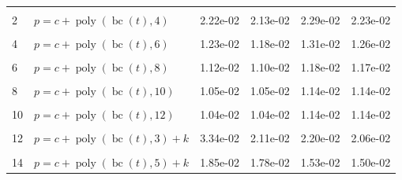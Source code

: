 \documentclass[12pt,a4paper]{article}
\DeclareMathOperator{\bc}{bc}
\DeclareMathOperator{\poly}{poly}
\begin{document}
\begin{longtable}[t]{ll>{\raggedleft\arraybackslash}p{2cm}>{\raggedleft\arraybackslash}p{2cm}>{\raggedleft\arraybackslash}p{2cm}>{\raggedleft\arraybackslash}p{2cm}}
\endfoot
\bottomrule
\endlastfoot
\cellcolor{gray!6}{1} & \cellcolor{gray!6}{$p = c + \poly\left( \bc(t), 3 \right)$} & \cellcolor{gray!6}{3.40e-02} & \cellcolor{gray!6}{2.23e-02} & \cellcolor{gray!6}{2.37e-02} & \cellcolor{gray!6}{2.25e-02}\\
2 & $p = c + \poly\left( \bc(t), 4 \right)$ & 2.22e-02 & 2.13e-02 & 2.29e-02 & 2.23e-02\\
\cellcolor{gray!6}{3} & \cellcolor{gray!6}{$p = c + \poly\left( \bc(t), 5 \right)$} & \cellcolor{gray!6}{1.97e-02} & \cellcolor{gray!6}{1.92e-02} & \cellcolor{gray!6}{1.77e-02} & \cellcolor{gray!6}{1.76e-02}\\
4 & $p = c + \poly\left( \bc(t), 6 \right)$ & 1.23e-02 & 1.18e-02 & 1.31e-02 & 1.26e-02\\
\cellcolor{gray!6}{5} & \cellcolor{gray!6}{$p = c + \poly\left( \bc(t), 7 \right)$} & \cellcolor{gray!6}{1.21e-02} & \cellcolor{gray!6}{1.15e-02} & \cellcolor{gray!6}{1.25e-02} & \cellcolor{gray!6}{1.23e-02}\\
6 & $p = c + \poly\left( \bc(t), 8 \right)$ & 1.12e-02 & 1.10e-02 & 1.18e-02 & 1.17e-02\\
\cellcolor{gray!6}{7} & \cellcolor{gray!6}{$p = c + \poly\left( \bc(t), 9 \right)$} & \cellcolor{gray!6}{1.07e-02} & \cellcolor{gray!6}{1.06e-02} & \cellcolor{gray!6}{1.17e-02} & \cellcolor{gray!6}{1.16e-02}\\
8 & $p = c + \poly\left( \bc(t), 10 \right)$ & 1.05e-02 & 1.05e-02 & 1.14e-02 & 1.14e-02\\
\cellcolor{gray!6}{9} & \cellcolor{gray!6}{$p = c + \poly\left( \bc(t), 11 \right)$} & \cellcolor{gray!6}{1.04e-02} & \cellcolor{gray!6}{1.04e-02} & \cellcolor{gray!6}{1.14e-02} & \cellcolor{gray!6}{1.14e-02}\\
10 & $p = c + \poly\left( \bc(t), 12 \right)$ & 1.04e-02 & 1.04e-02 & 1.14e-02 & 1.14e-02\\
\cellcolor{gray!6}{11} & \cellcolor{gray!6}{$p = c + \poly\left( \bc(t), 13 \right)$} & \cellcolor{gray!6}{1.04e-02} & \cellcolor{gray!6}{1.04e-02} & \cellcolor{gray!6}{1.14e-02} & \cellcolor{gray!6}{1.14e-02}\\
12 & $p = c + \poly\left( \bc(t), 3 \right) + k$ & 3.34e-02 & 2.11e-02 & 2.20e-02 & 2.06e-02\\
\cellcolor{gray!6}{13} & \cellcolor{gray!6}{$p = c + \poly\left( \bc(t), 4 \right) + k$} & \cellcolor{gray!6}{2.11e-02} & \cellcolor{gray!6}{2.01e-02} & \cellcolor{gray!6}{2.10e-02} & \cellcolor{gray!6}{2.04e-02}\\
14 & $p = c + \poly\left( \bc(t), 5 \right) + k$ & 1.85e-02 & 1.78e-02 & 1.53e-02 & 1.50e-02\\

\end{longtable}
\end{document}
